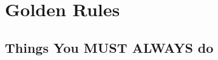 \immediate{}

\appendix

\chapter{Golden Rules}\label{sec:thingsyoumustdo}
\section{Things You MUST ALWAYS do}
\begin{itemize}
    
\end{itemize}


